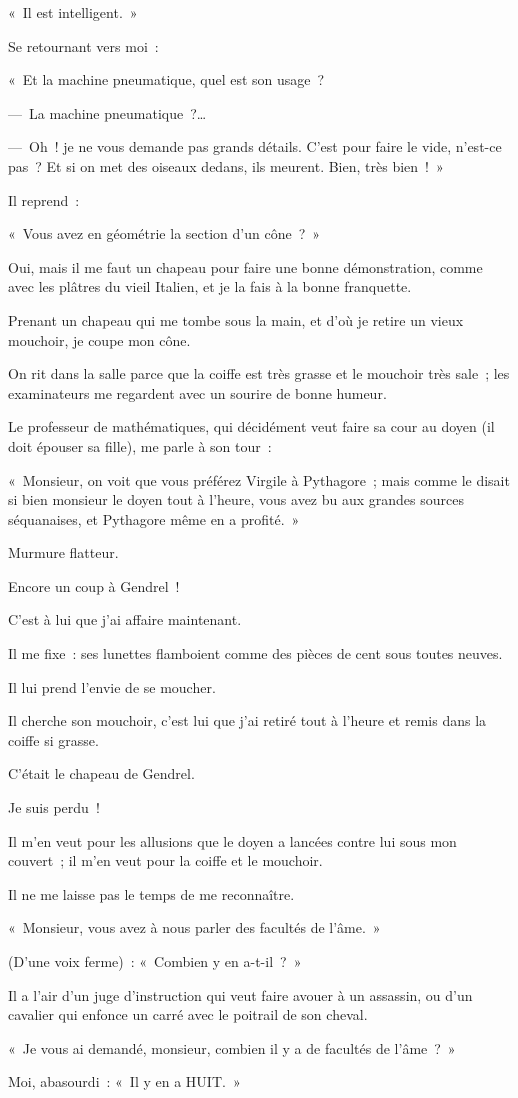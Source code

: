 \documentclass[french,twoside]{book} %
\begin{document}
« Il est intelligent. »\par
Se retournant vers moi :\par
« Et la machine pneumatique, quel est son usage ?\par
— La machine pneumatique ?…\par
— Oh ! je ne vous demande pas grands détails. C’est pour faire le vide, n’est-ce pas ? Et si on met des oiseaux dedans, ils meurent. Bien, très bien ! »\par
Il reprend :\par
« Vous avez en géométrie la section d’un cône ? »\par
Oui, mais il me faut un chapeau pour faire une bonne démonstration, comme avec les plâtres du vieil Italien, et je la fais à la bonne franquette.\par
Prenant un chapeau qui me tombe sous la main, et d’où je retire un vieux mouchoir, je coupe mon cône.\par
On rit dans la salle parce que la coiffe est très grasse et le mouchoir très sale ; les examinateurs me regardent avec un sourire de bonne humeur.\par
Le professeur de mathématiques, qui décidément veut faire sa cour au doyen (il doit épouser sa fille), me parle à son tour :\par
« Monsieur, on voit que vous préférez Virgile à Pythagore ; mais comme le disait si bien monsieur le doyen tout à l’heure, vous avez bu aux grandes sources séquanaises, et Pythagore même en a profité. »\par
Murmure flatteur.\par
Encore un coup à Gendrel !\par
C’est à lui que j’ai affaire maintenant.\par
Il me fixe : ses lunettes flamboient comme des pièces de cent sous toutes neuves.\par
Il lui prend l’envie de se moucher.\par
Il cherche son mouchoir, c’est lui que j’ai retiré tout à l’heure et remis dans la coiffe si grasse.\par
C’était le chapeau de Gendrel.\par
Je suis perdu !\par
Il m’en veut pour les allusions que le doyen a lancées contre lui sous mon couvert ; il m’en veut pour la coiffe et le mouchoir.\par
Il ne me laisse pas le temps de me reconnaître.\par
« Monsieur, vous avez à nous parler des facultés de l’âme. »\par
(D’une voix ferme) : « Combien y en a-t-il ? »\par
Il a l’air d’un juge d’instruction qui veut faire avouer à un assassin, ou d’un cavalier qui enfonce un carré avec le poitrail de son cheval.\par
« Je vous ai demandé, monsieur, combien il y a de facultés de l’âme ? »\par
Moi, abasourdi : « Il y en a HUIT. »\par
\end{document}
